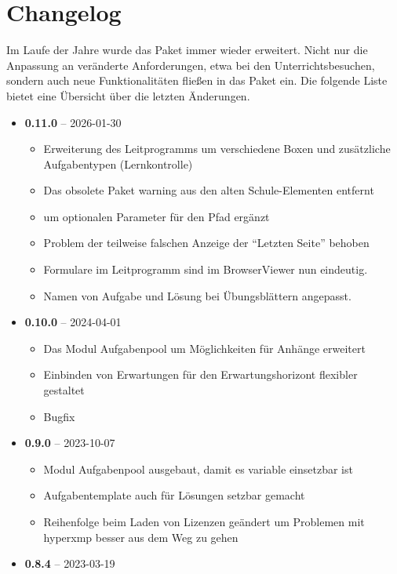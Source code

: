 \section{Changelog}
Im Laufe der Jahre wurde das Paket immer wieder erweitert. Nicht nur die Anpassung an veränderte Anforderungen, etwa bei den Unterrichtsbesuchen, sondern auch neue Funktionalitäten fließen in das Paket ein.
Die folgende Liste bietet eine Übersicht über die letzten Änderungen.
\begin{itemize}
    \item \textbf{0.11.0} -- 2026-01-30
    \begin{itemize}
        \item Erweiterung des Leitprogramms um verschiedene Boxen und zusätzliche Aufgabentypen (Lernkontrolle)
        \item Das obsolete Paket warning aus den alten Schule-Elementen entfernt
        \item {} um optionalen Parameter für den Pfad ergänzt
        \item Problem der teilweise falschen Anzeige der "`Letzten Seite"' behoben
        \item Formulare im Leitprogramm sind im BrowserViewer nun eindeutig.
        \item Namen von Aufgabe und Lösung bei Übungsblättern angepasst.
    \end{itemize}
    \item \textbf{0.10.0} -- 2024-04-01
    \begin{itemize}
      \item Das Modul Aufgabenpool um Möglichkeiten für Anhänge erweitert
      \item Einbinden von Erwartungen für den Erwartungshorizont flexibler gestaltet
      \item Bugfix
    \end{itemize}
    \item \textbf{0.9.0} -- 2023-10-07
    \begin{itemize}
      \item Modul Aufgabenpool ausgebaut, damit es variable einsetzbar ist
      \item Aufgabentemplate auch für Lösungen setzbar gemacht
      \item Reihenfolge beim Laden von Lizenzen geändert um Problemen mit hyperxmp besser aus dem Weg zu gehen
    \end{itemize}
    \item \textbf{0.8.4} -- 2023-03-19
    \begin{itemize}

\end{itemize}
\end{itemize}
